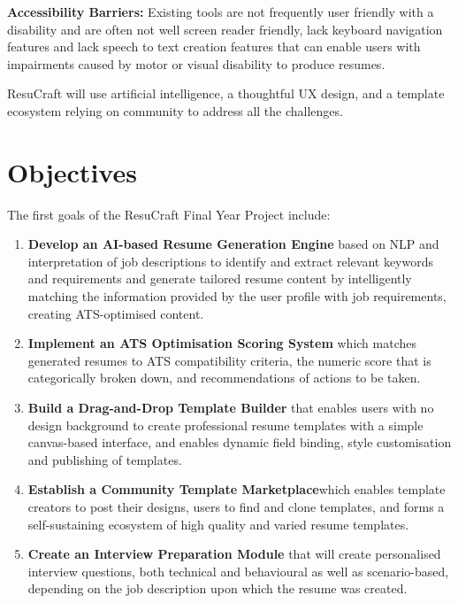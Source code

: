 \documentclass[12pt, a4paper, oneside]{report}
\begin{document}
\textbf{Accessibility Barriers:} 
Existing tools are not frequently user friendly with a disability and are often not well screen reader friendly, lack keyboard navigation features and lack speech to text creation features that can enable users with impairments caused by motor or visual disability to produce resumes\cite{wcag21}.


ResuCraft will use artificial intelligence, a thoughtful UX design, and a template ecosystem relying on community to address all the challenges.

\section{Objectives}

The first goals of the ResuCraft Final Year Project include:
\begin{enumerate}
    \item \textbf {Develop an AI-based Resume Generation Engine} based on NLP and interpretation of job descriptions to identify and extract relevant keywords and requirements and generate tailored resume content by intelligently matching the information provided by the user profile with job requirements, creating ATS-optimised content\cite{vaswani2017}.

    \item \textbf{Implement an ATS Optimisation Scoring System} which matches generated resumes to ATS compatibility criteria, the numeric score that is categorically broken down, and recommendations of actions to be taken.


    \item \textbf{Build a Drag-and-Drop Template Builder} that enables users with no design background to create professional resume templates with a simple canvas-based interface, and enables dynamic field binding, style customisation and publishing of templates.

    \item \textbf{Establish a Community Template Marketplace}which enables template creators to post their designs, users to find and clone templates, and forms a self-sustaining ecosystem of high quality and varied resume templates.

    \item \textbf{Create an Interview Preparation Module} that will create personalised interview questions, both technical and behavioural as well as scenario-based, depending on the job description upon which the resume was created.


\end{enumerate}
\end{document}
